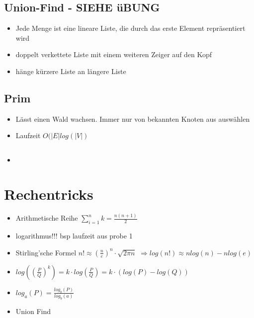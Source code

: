 \documentclass{article}
\begin{document}
\subsection{Union-Find - SIEHE {\"u}BUNG}
\begin{itemize}
\item Jede Menge ist eine lineare Liste, die durch das erste Element repr{\"a}sentiert wird
\item doppelt verkettete Liste mit einem weiteren Zeiger auf den Kopf
\item h{\"a}nge k{\"u}rzere Liste an l{\"a}ngere Liste
\end{itemize}

\subsection{Prim}
\begin{itemize}
\item L{\"a}sst einen Wald wachsen. Immer nur von bekannten Knoten aus ausw{\"a}hlen
\item  Laufzeit $O(|E| log(|V|)$
\end{itemize}







\subsection{}
\begin{itemize}
\item
\end{itemize}



\section{Rechentricks}
\begin{itemize}
\item Arithmetische Reihe $\sum_{i=1}^n k  = \frac{n(n+1)}{2} $
\item logarithmus!!! bsp laufzeit aus probe 1
\item Stirling'sche Formel $n! \approx (\frac{n}{e})^n \cdot \sqrt{2\pi n}$ \newline
$ \Rightarrow  log(n!) \approx nlog(n)-nlog(e)$
\item $log((\frac{P}{Q})^k) = k \cdot log(\frac{P}{Q}) = k \cdot (log(P) - log(Q)) $
\item $log_a(P) = \frac{log_b(P)}{log_b(a)}$

\item Union Find

\end{itemize}
\end{document}
